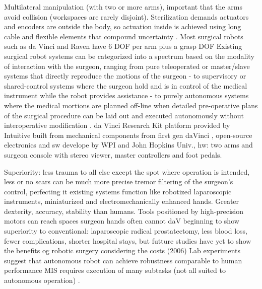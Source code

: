 Multilateral manipulation (with two or more arms), important that the arms avoid collision \citep{bib:raven_debride} (workspaces are rarely disjoint).
Sterilization demands actuators and encoders are outside the body, so actuation inside is achieved using long cable and flexible elements that compound uncertainty \citep{bib:raven_debride}.
Most surgical robots such as da Vinci and Raven have 6 DOF per arm plus a grasp DOF \citep{bib:raven_debride}
Existing surgical robot systems can be categorized into a spectrum based on the modality of interaction with the surgeon, ranging from pure teleoperated or master/slave systems that directly reproduce the motions of the surgeon - to supervisory or shared-control systems where the surgeon hold and is in control of the medical instrument while the robot provides assistance - to purely autonomous systems where the medical mortions are planned off-line when detailed pre-operative plans of the surgical procedure can be laid out and executed autonomously without interoperative modification \citep{bib:raven_debride}.
da Vinci Research Kit platform provided by Intuitive built from mechanical components from first gen daVinci \citep{bib:raven_observ}, open-source electronics and sw develope by WPI and John Hopkins Univ., hw: two arms and surgeon console with stereo viewer, master controllers and foot pedals.

Superiority:
less trauma to all else except the spot where operation is intended, less or no scars
can be much more precise
tremor filtering of the surgeon's control, perfecting it
existing systems function like robotized laparoscopic instruments, miniaturized and electromechanically enhanced hands. Greater dexterity, accuracy, stability than humans. Tools positioned by high-precision motors can reach spaces surgeon hands often cannot \citep{bib:docatadist}
daV beginning to show superiority to  conventional: laparoscopic radical prostatectomy, less blood loss, fewer complications, shorter hospital stays, but futture studies have yet to show the benefits og robotic surgery considering the costs (2006) \citep{bib:docatadist}
Lab experiments suggest that autonomous robot can achieve robustness comparable to human performance \citep{bib:raven_debride}
MIS requires execution of many subtasks (not all suited to autonomous operation) \citep{bib:raven_debride}.

